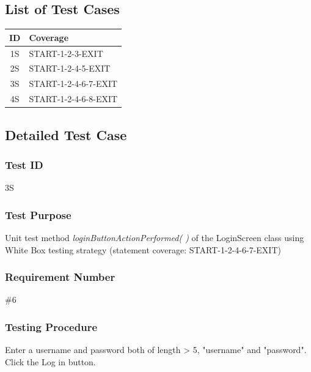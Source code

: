 \documentclass{article}
\begin{document}
\subsection{List of Test Cases}
\begin{center}
  \begin{tabular}{| c | l |}
    \hline
    ID & Coverage\\
    \hline
    1S & START-1-2-3-EXIT\\
    2S & START-1-2-4-5-EXIT\\
    3S & START-1-2-4-6-7-EXIT\\
    4S & START-1-2-4-6-8-EXIT\\
    \hline
  \end{tabular}
\end{center}

\subsection{Detailed Test Case}
\subsubsection{Test ID}
3S

\subsubsection{Test Purpose}
Unit test method \textit{loginButtonActionPerformed( )} of the LoginScreen class using White Box testing strategy (statement coverage: START-1-2-4-6-7-EXIT)

\subsubsection{Requirement Number}
\#6


\subsubsection{Testing Procedure}
Enter a username and password both of length > 5, "username" and "password".  Click the Log in button.
\end{document}
